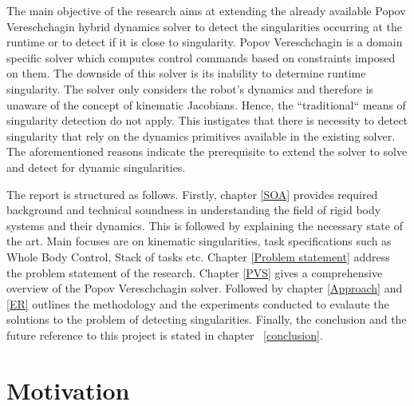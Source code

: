The main objective of the research aims at extending the already available Popov Vereschchagin hybrid dynamics solver to detect the singularities occurring at the runtime or to detect if it is close to singularity. Popov Vereschchagin is a domain specific solver which computes control commands based on constraints imposed on them. The downside of this solver is its inability to determine runtime singularity. The solver only considers the robot's dynamics and therefore is unaware of the concept of kinematic Jacobians. Hence, the ``traditional`` means of singularity detection do not apply. This instigates that there is necessity to detect singularity that rely on the dynamics primitives available in the existing solver. The aforementioned reasons indicate the prerequisite to extend the solver to solve and detect for dynamic singularities.
\par
The report is structured as follows. Firstly, chapter \ref{SOA} provides required background and technical soundness in understanding the field of rigid body systems and their dynamics. This is followed by explaining the necessary state of the art. Main focuses are on kinematic singularities, task specifications such as Whole Body Control, Stack of tasks etc. Chapter \ref{Problem statement} address the problem statement of the research. Chapter \ref{PVS} gives a comprehensive overview of the Popov Vereschchagin solver. Followed by chapter \ref{Approach} and \ref{ER} outlines the methodology and the experiments conducted to evalaute the solutions to the problem of detecting singularities. Finally, the conclusion and the future reference to this project is stated in chapter ~\ref{conclusion}.

\section{Motivation} \label{Motivation}

